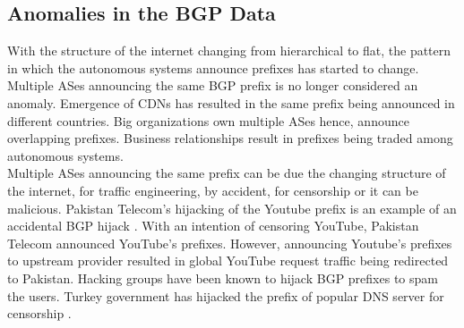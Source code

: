 \subsection{Anomalies in the BGP Data}
With the structure of the internet changing from hierarchical to flat, the pattern in which the autonomous systems announce prefixes has started to change. Multiple ASes announcing the same BGP prefix is no longer considered an anomaly. Emergence of CDNs has resulted in the same prefix being announced in different countries. Big organizations own multiple ASes hence, announce overlapping prefixes. Business relationships result in prefixes being traded among autonomous systems.\\
Multiple ASes announcing the same prefix can be due the changing structure of the internet, for traffic engineering, by accident, for censorship or it can be malicious. Pakistan Telecom's hijacking of the Youtube prefix is an example of an accidental BGP hijack \cite{alshamrani_detecting_2017}. With an intention of censoring YouTube, Pakistan Telecom announced YouTube's prefixes. However, announcing Youtube's prefixes to upstream provider resulted in global YouTube request traffic being redirected to Pakistan. Hacking groups have been known to hijack BGP prefixes to spam the users\cite{Ramachandran:2006:UNB:1159913.1159947}. Turkey government has hijacked the prefix of popular DNS server for censorship \cite{florio_bypassing_2014}.